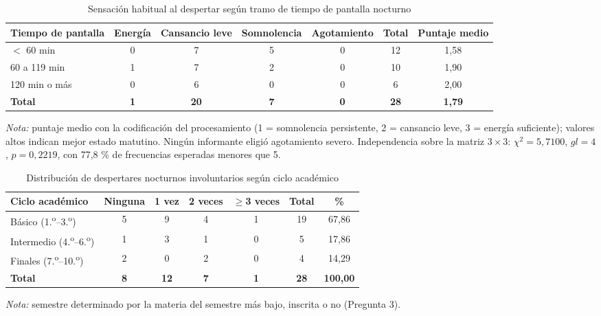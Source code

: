 \begin{table}[H]
\centering
\caption{Sensación habitual al despertar según tramo de tiempo de pantalla nocturno}
\label{tab:c5}
\footnotesize
\begin{tabular}{lcccccc}
\toprule
\textbf{Tiempo de pantalla} & \textbf{Energía} & \textbf{Cansancio leve} & \textbf{Somnolencia} & \textbf{Agotamiento} & \textbf{Total} & \textbf{Puntaje medio} \\
\midrule
$<$ 60 min & 0 & 7 & 5 & 0 & 12 & 1,58 \\
60 a 119 min & 1 & 7 & 2 & 0 & 10 & 1,90 \\
120 min o más & 0 & 6 & 0 & 0 & 6 & 2,00 \\
\midrule
\textbf{Total} & \textbf{1} & \textbf{20} & \textbf{7} & \textbf{0} & \textbf{28} & \textbf{1,79} \\
\bottomrule
\end{tabular}
\par\smallskip\parbox{0.92\linewidth}{\footnotesize\textit{Nota:} puntaje medio con la codificación del procesamiento (1 = somnolencia persistente, 2 = cansancio leve, 3 = energía suficiente); valores altos indican mejor estado matutino. Ningún informante eligió \guillemotleft agotamiento severo\guillemotright. Independencia sobre la matriz $3\times 3$: $\chi^2 = 5,7100$, $gl = 4$, $p = 0,2219$, con 77,8 \% de frecuencias esperadas menores que 5.}
\fuente
\end{table}

\begin{table}[H]
\centering
\caption{Distribución de despertares nocturnos involuntarios según ciclo académico}
\label{tab:c6}
\footnotesize
\begin{tabular}{lcccccc}
\toprule
\textbf{Ciclo académico} & \textbf{Ninguna} & \textbf{1 vez} & \textbf{2 veces} & \textbf{$\ge$3 veces} & \textbf{Total} & \textbf{\%} \\
\midrule
Básico (1.\textsuperscript{o}--3.\textsuperscript{o}) & 5 & 9 & 4 & 1 & 19 & 67,86 \\
Intermedio (4.\textsuperscript{o}--6.\textsuperscript{o}) & 1 & 3 & 1 & 0 & 5 & 17,86 \\
Finales (7.\textsuperscript{o}--10.\textsuperscript{o}) & 2 & 0 & 2 & 0 & 4 & 14,29 \\
\midrule
\textbf{Total} & \textbf{8} & \textbf{12} & \textbf{7} & \textbf{1} & \textbf{28} & \textbf{100,00} \\
\bottomrule
\end{tabular}
\par\smallskip\parbox{0.92\linewidth}{\footnotesize\textit{Nota:} semestre determinado por la materia del semestre más bajo, inscrita o no (Pregunta 3).}
\fuente
\end{table}

